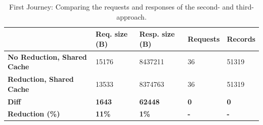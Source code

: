 \ifshowTables
\begin{table}[H]
  \begin{tabular}{|l|l|l|l|l|}
  \hline
  & \textbf{Req. size (B)} & \textbf{Resp. size (B)} & \textbf{Requests} & \textbf{Records} \\
  \hline
  \textbf{No Reduction, Shared Cache} & 15176 &  8437211 & 36 & 51319 \\
  \hline
  \textbf{Reduction, Shared Cache} &  13533 &  8374763 & 36 & 51319 \\
  \hline
  \hline
  \textbf{Diff} & \textbf{1643} & \textbf{62448} & \textbf{0} & \textbf{0} \\
  \hline
  \textbf{Reduction (\%)} & \textbf{11\%} & \textbf{1\%} & \textbf{-} & \textbf{-} \\
  \hline
  \end{tabular}
  \caption{First Journey: Comparing the requests and responses of the second- and third-approach.}\label{table:results:size-comparison-first-path-cache-no-reduction-cache-reduction}
\end{table}
\fi